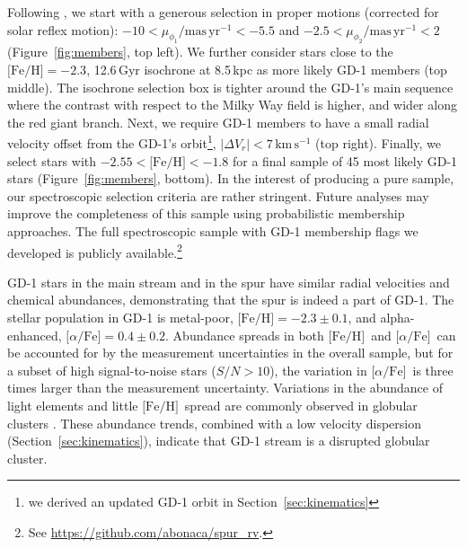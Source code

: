 \documentclass[twocolumn]{aastex63}
\newcommand{\kms}{\ensuremath{\textrm{km}\,\textrm{s}^{-1}}}
\newcommand{\masyr}{\ensuremath{\textrm{mas}\,\textrm{yr}^{-1}}}
\newcommand{\feh}{\ensuremath{\textrm{[Fe/H]}}}
\newcommand{\afe}{\ensuremath{\textrm{[$\alpha$/Fe]}}}
\begin{document}
Following \citet{pwb}, we start with a generous selection in proper motions (corrected for solar reflex motion): $-10<\mu_{\phi_1}/\masyr<-5.5$ and $-2.5<\mu_{\phi_2}/\masyr<2$ (Figure~\ref{fig:members}, top left).
We further consider stars close to the $\textrm{[Fe/H]}=-2.3$, 12.6\,Gyr isochrone at 8.5\,kpc \citep{choi2016} as more likely GD-1 members (top middle).
The isochrone selection box is tighter around the GD-1's main sequence where the contrast with respect to the Milky Way field is higher, and wider along the red giant branch.
Next, we require GD-1 members to have a small radial velocity offset from the GD-1's orbit\footnote{we derived an updated GD-1 orbit in Section~\ref{sec:kinematics}}, $|\Delta V_r| < 7\,\kms$ (top right).
Finally, we select stars with $-2.55<\feh<-1.8$ for a final sample of 45 most likely GD-1 stars (Figure~\ref{fig:members}, bottom).
In the interest of producing a pure sample, our spectroscopic selection criteria are rather stringent.
Future analyses may improve the completeness of this sample using probabilistic membership approaches.
The full spectroscopic sample with GD-1 membership flags we developed is publicly available.\footnote{See \url{https://github.com/abonaca/spur_rv}.}

GD-1 stars in the main stream and in the spur have similar radial velocities and chemical abundances, demonstrating that the spur is indeed a part of GD-1.
The stellar population in GD-1 is metal-poor, $\feh=-2.3\pm0.1$, and alpha-enhanced, $\afe=0.4\pm0.2$.
Abundance spreads in both \feh\ and \afe\ can be accounted for by the measurement uncertainties in the overall sample, but for a subset of high signal-to-noise stars ($S/N>10$), the variation in \afe\ is three times larger than the measurement uncertainty.
Variations in the abundance of light elements and little \feh\ spread are commonly observed in globular clusters \citep{gratton2019}.
These abundance trends, combined with a low velocity dispersion (Section~\ref{sec:kinematics}), indicate that GD-1 stream is a disrupted globular cluster.

\end{document}
